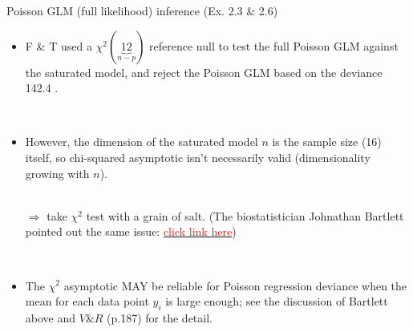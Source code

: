 \documentclass{beamer}
\begin{document}
\begin{frame} { Poisson GLM (full likelihood) inference (Ex. 2.3 \& 2.6)}

\begin{itemize}
\item F \& T used  a $\chi^2(\underbrace{12}_{n - p})$ reference null to test the full Poisson GLM against the saturated model, and reject the Poisson GLM based on the deviance 142.4 . 


\ \
\item However, the dimension of the saturated model $n$ is the sample size (16) itself, so chi-squared asymptotic isn't necessarily valid (dimensionality growing with $n$). \\

\ \

$\Rightarrow$ take $\chi^2$ test with a grain of salt. (The biostatistician Johnathan Bartlett pointed out the same issue: \href{https://thestatsgeek.com/2014/04/26/deviance-goodness-of-fit-test-for-poisson-regression/}{\textcolor{red}{click link here}})

\ \


\item The $\chi^2$ asymptotic MAY be reliable for Poisson regression deviance when the mean for each data point $y_i$ is large enough; see the discussion of Bartlett above and $V\& R$ (p.187) for the detail. 

\end{itemize}


\end{frame}
\end{document}

